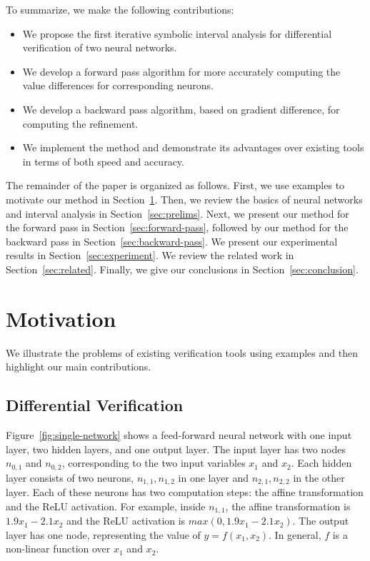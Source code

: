 To summarize, we make the following contributions:
\begin{itemize}
\item
We propose the first iterative symbolic interval analysis for
differential verification of two neural networks.
\item
We develop a forward pass algorithm for more accurately computing the
value differences for corresponding neurons.
\item
We develop a backward pass algorithm, based on gradient difference,
for computing the refinement.
\item
We implement the method and demonstrate its advantages over existing
tools in terms of both speed and accuracy.
\end{itemize}


The remainder of the paper is organized as follows.  First, we use
examples to motivate our method in Section~\ref{sec:motivation}.
Then, we review the basics of neural networks and interval analysis in
Section~\ref{sec:prelims}.  Next, we present our method for the
forward pass in Section~\ref{sec:forward-pass}, followed by our method
for the backward pass in Section~\ref{sec:backward-pass}.  We present
our experimental results in Section~\ref{sec:experiment}.  We review
the related work in Section~\ref{sec:related}.  Finally, we give our
conclusions in Section~\ref{sec:conclusion}.




\section{Motivation}
\label{sec:motivation}

We illustrate the problems of existing verification tools using
examples and then highlight our main contributions.


\subsection{Differential Verification}

Figure~\ref{fig:single-network} shows a feed-forward neural network
with one input layer, two hidden layers, and one output layer.
%
The input layer has two nodes $n_{0,1}$ and $n_{0,2}$, corresponding to
the two input variables $x_1$ and $x_2$.
%
Each hidden layer consists of two neurons, $n_{1,1}, n_{1,2}$ in one
layer and $n_{2,1},n_{2,2}$ in the other layer.  Each of these neurons
has two computation steps: the affine transformation and the ReLU
activation.  For example, inside $n_{1,1}$, the affine transformation
is $1.9 x_1 -2.1 x_2$ and the ReLU activation is $max(0, 1.9 x_1 - 2.1
x_2)$.
%
The output layer has one node, representing the value of $y =
f(x_1,x_2)$. In general, $f$ is a non-linear function over $x_1$ and
$x_2$.



